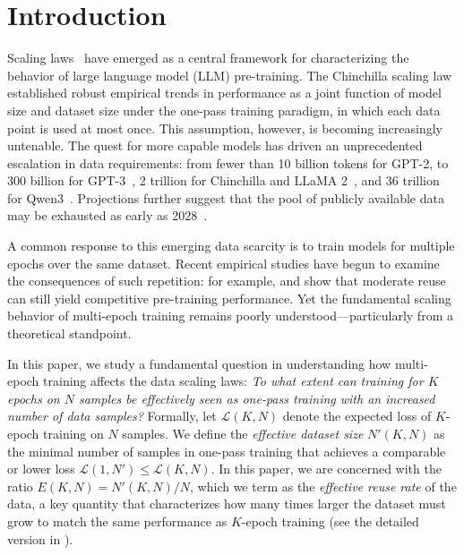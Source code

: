 \section{Introduction}

Scaling laws~\citep{hestness2017deep,kaplan2020scaling,hoffmann2022training} have emerged as a central framework for characterizing the behavior of large language model (LLM) pre-training.
The Chinchilla scaling law~\citep{hoffmann2022training} established robust empirical trends in performance as a joint function of model size and dataset size under the one-pass training paradigm, in which each data point is used at most once.
This assumption, however, is becoming increasingly untenable.
The quest for more capable models has driven an unprecedented escalation in data requirements: from fewer than 10 billion tokens for GPT-2, to 300 billion for GPT-3~\citep{brown2020language}, 2 trillion for Chinchilla and LLaMA 2~\citep{hoffmann2022training, touvron2023llama}, and 36 trillion for Qwen3~\citep{yang2025qwen3}.
Projections further suggest that the pool of publicly available data may be exhausted as early as 2028~\citep{villalobos2024run}.

A common response to this emerging data scarcity is to train models for multiple epochs over the same dataset.
Recent empirical studies have begun to examine the consequences of such repetition: for example, \citet{muennighoff2023scaling} and \citet{xue2023repeat} show that moderate reuse can still yield competitive pre-training performance.
Yet the fundamental scaling behavior of multi-epoch training remains poorly understood—particularly from a theoretical standpoint.

In this paper, we study a fundamental question in understanding how multi-epoch training affects the data scaling laws: \textit{To what extent can training for $K$ epochs on $N$ samples be effectively seen as one-pass training with an increased number of data samples?}
Formally, let $\mathcal{L}(K, N)$ denote the expected loss of $K$-epoch training on $N$ samples. We define the \textit{effective dataset size} $N'(K, N)$ as the minimal number of samples in one-pass training that achieves a comparable or lower loss $\mathcal{L}(1, N') \leq \mathcal{L}(K, N)$.
In this paper, we are concerned with the ratio $E(K, N) = N'(K, N)/N$, which we term as the \textit{effective reuse rate} of the data, a key quantity that characterizes how many times larger the dataset must grow to match the same performance as $K$-epoch training (see the detailed version in ).


